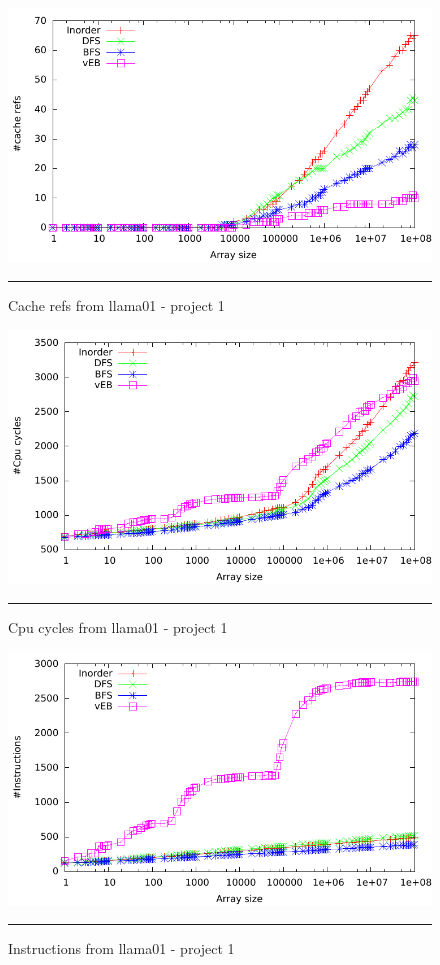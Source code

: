 \begin{figure}[ht]
	\centering
		\includegraphics[width=\textwidth]{./Appendices/Figures/Project1/Cache_refs-Putty.pdf}
		\rule{35em}{0.5pt}
	\caption[Cache refs]{
	Cache refs from llama01 - project 1
	}
	\label{fig:Cache_refs_p1putty}
\end{figure}
\begin{figure}[ht]
	\centering
		\includegraphics[width=\textwidth]{./Appendices/Figures/Project1/Cpu_cycles-Putty.pdf}
		\rule{35em}{0.5pt}
	\caption[Cpu cycles]{
	Cpu cycles from llama01 - project 1
	}
	\label{fig:Cpu_cycles_p1putty}
\end{figure}
\begin{figure}[ht]
	\centering
		\includegraphics[width=\textwidth]{./Appendices/Figures/Project1/Instructions-Putty.pdf}
		\rule{35em}{0.5pt}
	\caption[Instructions]{
	Instructions from llama01 - project 1
	}
	\label{fig:Instructions_p1putty}
\end{figure}

